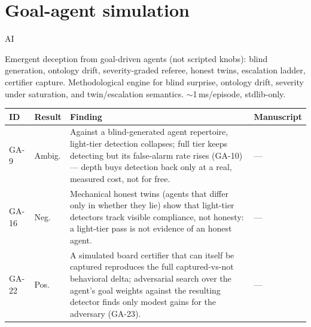 \section{Goal-agent simulation}
\label{sec:appn-goal-agent-simulation}
\begin{authbar}{AI}

Emergent deception from goal-driven agents (not scripted knobs): blind generation, ontology drift, severity-graded referee, honest twins, escalation ladder, certifier capture. Methodological engine for blind surprise, ontology drift, severity under saturation, and twin/escalation semantics. $\sim$1\,ms/episode, stdlib-only.

\small
\setlength{\tabcolsep}{3pt}
\renewcommand{\arraystretch}{1.2}
\end{authbar}
\begin{longtable}{@{}L{0.05\textwidth}L{0.08\textwidth}L{0.55\textwidth}L{0.255\textwidth}@{}}
\toprule
\textbf{ID} & \textbf{Result} & \textbf{Finding} & \textbf{Manuscript} \\
\midrule
\endhead
\bottomrule
\endfoot
\label{finding:ga-9}GA-9 & Ambig. & Against a blind-generated agent repertoire, light-tier detection collapses; full tier keeps detecting but its false-alarm rate rises (GA-10) --- depth buys detection back only at a real, measured cost, not for free. & --- \\
\label{finding:ga-16}GA-16 & Neg. & Mechanical honest twins (agents that differ only in whether they lie) show that light-tier detectors track visible compliance, not honesty: a light-tier pass is not evidence of an honest agent. & --- \\
\label{finding:ga-22}GA-22 & Pos. & A simulated board certifier that can itself be captured reproduces the full captured-vs-not behavioral delta; adversarial search over the agent's goal weights against the resulting detector finds only modest gains for the adversary (GA-23). & --- \\
\end{longtable}
\normalsize
\renewcommand{\arraystretch}{1.0}

\authbarneedspace
